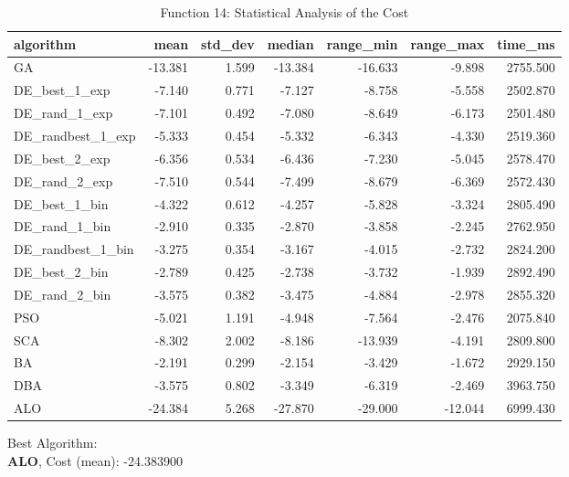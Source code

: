 \documentclass[12pt]{article}
\begin{document}
\begin{table}[H]
    \centering
    \footnotesize
    \begin{adjustbox}{width=1\textwidth}
        \begin{tabular}{lrrrrrr}
            \toprule
            algorithm &    mean &  std\_dev &  median &  range\_min &  range\_max &  time\_ms \\
            \midrule
            GA & -13.381 & 1.599 & -13.384 & -16.633 & -9.898 & 2755.500 \\
            DE\_best\_1\_exp & -7.140 & 0.771 & -7.127 & -8.758 & -5.558 & 2502.870 \\
            DE\_rand\_1\_exp & -7.101 & 0.492 & -7.080 & -8.649 & -6.173 & 2501.480 \\
            DE\_randbest\_1\_exp & -5.333 & 0.454 & -5.332 & -6.343 & -4.330 & 2519.360 \\
            DE\_best\_2\_exp & -6.356 & 0.534 & -6.436 & -7.230 & -5.045 & 2578.470 \\
            DE\_rand\_2\_exp & -7.510 & 0.544 & -7.499 & -8.679 & -6.369 & 2572.430 \\
            DE\_best\_1\_bin & -4.322 & 0.612 & -4.257 & -5.828 & -3.324 & 2805.490 \\
            DE\_rand\_1\_bin & -2.910 & 0.335 & -2.870 & -3.858 & -2.245 & 2762.950 \\
            DE\_randbest\_1\_bin & -3.275 & 0.354 & -3.167 & -4.015 & -2.732 & 2824.200 \\
            DE\_best\_2\_bin & -2.789 & 0.425 & -2.738 & -3.732 & -1.939 & 2892.490 \\
            DE\_rand\_2\_bin & -3.575 & 0.382 & -3.475 & -4.884 & -2.978 & 2855.320 \\
            PSO & -5.021 & 1.191 & -4.948 & -7.564 & -2.476 & 2075.840 \\
            SCA & -8.302 & 2.002 & -8.186 & -13.939 & -4.191 & 2809.800 \\
            BA & -2.191 & 0.299 & -2.154 & -3.429 & -1.672 & 2929.150 \\
            DBA & -3.575 & 0.802 & -3.349 & -6.319 & -2.469 & 3963.750 \\
            ALO & -24.384 & 5.268 & -27.870 & -29.000 & -12.044 & 6999.430 \\
            \bottomrule
        \end{tabular}
        
        
    \end{adjustbox}
    \caption{Function 14: Statistical Analysis of the Cost} 
\end{table}
Best Algorithm: \\
\textbf{ALO}, Cost (mean): -24.383900\\
\newpage
\end{document}
